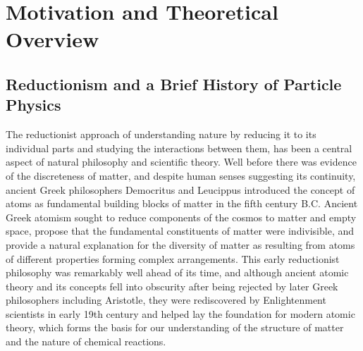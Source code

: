 
\chapter{Motivation and Theoretical Overview}
\label{Motivation_and_Theoretical_Overview}



\section{Reductionism and a Brief History of Particle Physics}
The reductionist approach of understanding nature by reducing it to its individual parts and studying the interactions between them, has been a central aspect of natural philosophy and scientific theory.
Well before there was evidence of the discreteness of matter, and despite human senses suggesting its continuity, ancient Greek philosophers Democritus and Leucippus introduced the concept of atoms as fundamental building blocks of matter in the fifth century B.C.
Ancient Greek atomism sought to reduce components of the cosmos to matter and empty space, propose that the fundamental constituents of matter were indivisible, and provide a natural explanation for the diversity of matter as resulting from atoms of different properties forming complex arrangements.
This early reductionist philosophy was remarkably well ahead of its time, and although ancient atomic theory and its concepts fell into obscurity after being rejected by later Greek philosophers including Aristotle, they were rediscovered by Enlightenment scientists in early 19th century and helped lay the foundation for modern atomic theory, which forms the basis for our understanding of the structure of matter and the nature of chemical reactions.

